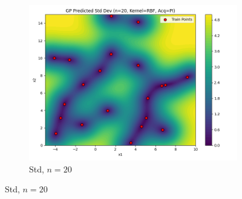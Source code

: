\documentclass[a4paper,12pt]{article}
\begin{document}
\begin{figure}[H]
\begin{subfigure}{0.3\textwidth}
    \includegraphics[width=\linewidth]{Task-02/images/gp_std_rbf_n20_PI.png}
    \caption{Std, $n=20$}
\end{subfigure}


\end{figure}
\end{document}

